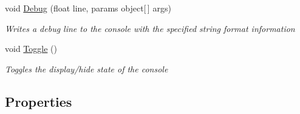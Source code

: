 \begin{DoxyCompactItemize}
void \hyperlink{class_m_b2_d_1_1_m_b_console_a918307d1a003684b1fa3e0d11243b1f9}{Debug} (float line, params object\mbox{[}$\,$\mbox{]} args)
\begin{DoxyCompactList}\small\item\em Writes a debug line to the console with the specified string format information \end{DoxyCompactList}\item 
void \hyperlink{class_m_b2_d_1_1_m_b_console_aab4c284a98afb148e35cf28e6d8ba0fc}{Toggle} ()
\begin{DoxyCompactList}\small\item\em Toggles the display/hide state of the console \end{DoxyCompactList}\end{DoxyCompactItemize}
\subsection*{Properties}
